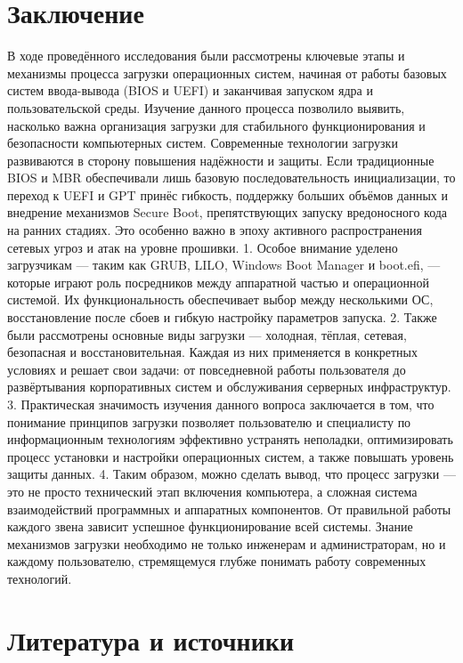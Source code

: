 \hypertarget{ux437ux430ux43aux43bux44eux447ux435ux43dux438ux435}{%
\chapter{Заключение}\label{ux437ux430ux43aux43bux44eux447ux435ux43dux438ux435}}

В ходе проведённого исследования были рассмотрены ключевые этапы и
механизмы процесса загрузки операционных систем, начиная от работы
базовых систем ввода-вывода (BIOS и UEFI) и заканчивая запуском ядра и
пользовательской среды. Изучение данного процесса позволило выявить,
насколько важна организация загрузки для стабильного функционирования и
безопасности компьютерных систем. Современные технологии загрузки
развиваются в сторону повышения надёжности и защиты. Если традиционные
BIOS и MBR обеспечивали лишь базовую последовательность инициализации,
то переход к UEFI и GPT принёс гибкость, поддержку больших объёмов
данных и внедрение механизмов Secure Boot, препятствующих запуску
вредоносного кода на ранних стадиях. Это особенно важно в эпоху
активного распространения сетевых угроз и атак на уровне прошивки. 1.
Особое внимание уделено загрузчикам --- таким как GRUB, LILO, Windows
Boot Manager и boot.efi, --- которые играют роль посредников между
аппаратной частью и операционной системой. Их функциональность
обеспечивает выбор между несколькими ОС, восстановление после сбоев и
гибкую настройку параметров запуска. 2. Также были рассмотрены основные
виды загрузки --- холодная, тёплая, сетевая, безопасная и
восстановительная. Каждая из них применяется в конкретных условиях и
решает свои задачи: от повседневной работы пользователя до развёртывания
корпоративных систем и обслуживания серверных инфраструктур. 3.
Практическая значимость изучения данного вопроса заключается в том, что
понимание принципов загрузки позволяет пользователю и специалисту по
информационным технологиям эффективно устранять неполадки,
оптимизировать процесс установки и настройки операционных систем, а
также повышать уровень защиты данных. 4. Таким образом, можно сделать
вывод, что процесс загрузки --- это не просто технический этап включения
компьютера, а сложная система взаимодействий программных и аппаратных
компонентов. От правильной работы каждого звена зависит успешное
функционирование всей системы. Знание механизмов загрузки необходимо не
только инженерам и администраторам, но и каждому пользователю,
стремящемуся глубже понимать работу современных технологий.

\hypertarget{ux43bux438ux442ux435ux440ux430ux442ux443ux440ux430-ux438-ux438ux441ux442ux43eux447ux43dux438ux43aux438}{%
\chapter{Литература и
источники}\label{ux43bux438ux442ux435ux440ux430ux442ux443ux440ux430-ux438-ux438ux441ux442ux43eux447ux43dux438ux43aux438}}

